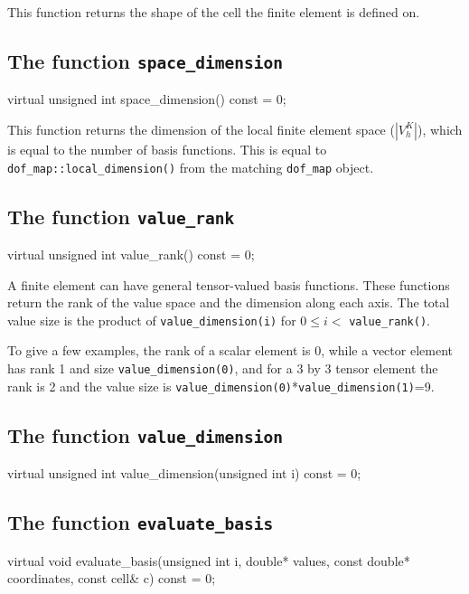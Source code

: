 This function returns the shape of the cell the finite element is
defined on.

\subsection{The function \texttt{space\_dimension}}

\begin{code}
virtual unsigned int space_dimension() const = 0;
\end{code}

This function returns the dimension of the local finite element space ($| V_h^K |$),
which is equal to the number of basis functions. This is equal to \texttt{dof\_map::local\_dimension()}
from the matching \texttt{dof\_map} object.

\subsection{The function \texttt{value\_rank}}

\begin{code}
virtual unsigned int value_rank() const = 0;
\end{code}

A finite element can have general tensor-valued basis functions.
These functions return the rank of the value space and the dimension along each axis.
The total value size is the product of \texttt{value\_dimension(i)} for $0 \le i <$ \texttt{value\_rank()}.

To give a few examples, the rank of a scalar element is 0, while a vector element has rank 1 and size \texttt{value\_dimension(0)}, 
and for a 3 by 3 tensor element the rank is 2 and the value size is \texttt{value\_dimension(0)}*\texttt{value\_dimension(1)}=9.

\subsection{The function \texttt{value\_dimension}}

\begin{code}
virtual unsigned int value_dimension(unsigned int i) const = 0;
\end{code}

\subsection{The function \texttt{evaluate\_basis}}

\begin{code}
virtual void evaluate_basis(unsigned int i,
                            double* values,
                            const double* coordinates,
                            const cell& c) const = 0;
\end{code}

